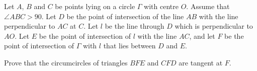 Let $A$,  $B$ and $C$ be points lying on a circle $\Gamma$ with centre $O$. Assume that $\angle ABC > 90$. Let $D$ be the point of intersection of the line $AB$ with the line perpendicular to $AC$ at $C$. Let $l$ be the line through $D$ which is perpendicular to $AO$. Let $E$ be the point of intersection of $l$ with the line $AC$,  and let $F$ be the point of intersection of $\Gamma$ with $l$ that lies between $D$ and $E$.

Prove that the circumcircles of triangles $BFE$ and $CFD$ are tangent at $F$.